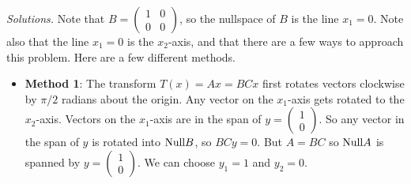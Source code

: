     \ifnum {} {\color{DarkBlue} \textit{Solutions.} 
    Note that $B = \begin{pmatrix} 1&0\\0&0\end{pmatrix}$, so the nullspace of $B$ is the line $x_1= 0$. Note also that the line $x_1=0$ is the $x_2$-axis, and that there are a few ways to approach this problem. Here are a few different methods. 
    \begin{itemize}
        \item \textbf{Method 1}: The transform $T(x) = Ax = BCx$ first rotates vectors clockwise by $\pi/2$ radians about the origin. Any vector on the $x_1$-axis gets rotated to the $x_2$-axis. Vectors on the $x_1$-axis are in the span of $y = \begin{pmatrix} 1\\0 \end{pmatrix}$. So any vector in the span of $y$ is rotated into $\text{Null} B$, so $BCy = 0$. But $A=BC$ so $\text{Null} A$ is spanned by $y = \begin{pmatrix} 1\\0\end{pmatrix}$. We can choose $y_1 = 1$ and $y_2=0$. 

\end{itemize}}
